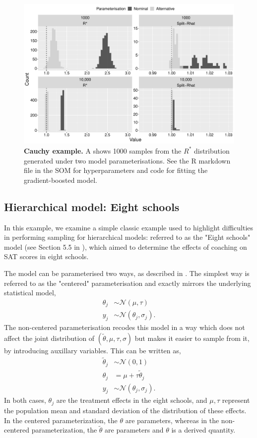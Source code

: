 \documentclass{article}
\newcommand{\N}{\mathcal{N}}
\begin{document}
\begin{figure}[h]
	\centerline{\includegraphics[width=1.0\textwidth]{../output/cauchy.pdf}}
	\caption{\textbf{Cauchy example.} A shows 1000 samples from the $R^*$ distribution generated under two model parameterisations. See the R markdown file in the SOM for hyperparameters and code for fitting the gradient-boosted model.}
	\label{fig:cauchy}
\end{figure}

\subsection{Hierarchical model: Eight schools}
In this example, we examine a simple classic example used to highlight difficulties in performing sampling for hierarchical models: referred to as the "Eight schools" model (see Section 5.5 in \cite{gelman2013bayesian}), which aimed to determine the effects of coaching on SAT scores in eight schools. 

The model can be parameterised two ways, as described in \cite{vehtari2019rank}. The simplest way is referred to as the "centered" parameterisation and exactly mirrors the underlying statistical model,
%
\begin{align*}
\theta_j &\sim \N(\mu, \tau) \\
y_j &\sim \N(\theta_j, \sigma_j).
\end{align*}
%
The non-centered parameterisation recodes this model in a way which does not affect the joint distribution of $(\tilde{\theta}, \mu, \tau, \sigma)$ but makes it easier to sample from it, by introducing auxillary variables. This can be written as,
%
\begin{align*}
\tilde{\theta}_j &\sim \N(0, 1) \\
\theta_j &= \mu + \tau \tilde{\theta}_j \\
y_j &\sim \N(\theta_j, \sigma_j).
\end{align*}
%
In both cases, $\theta_j$ are the treatment effects in the eight schools, and $\mu, \tau$ represent the population mean and standard deviation 
of the distribution of these effects. In the centered parameterization, the $\theta$ are parameters, whereas in the non-centered parameterization, the $\tilde{\theta}$ are parameters and $\theta$ is a derived quantity.
\end{document}
